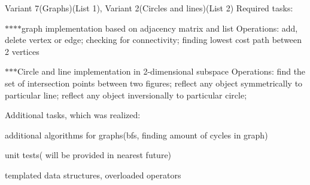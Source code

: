 Variant 7(Graphs)(List 1), Variant 2(Circles and lines)(List 2) Required tasks\+:

$\ast$$\ast$$\ast$$\ast$graph implementation based on adjacency matrix and list Operations\+: add, delete vertex or edge; checking for connectivity; finding lowest cost path between 2 vertices

$\ast$$\ast$$\ast$\+Circle and line implementation in 2-\/dimensional subspace Operations\+: find the set of intersection points between two figures; reflect any object symmetrically to particular line; reflect any object inversionally to particular circle;

Additional tasks, which was realized\+:


\begin{DoxyItemize}
\item additional algorithms for graphs(bfs, finding amount of cycles in graph)
\item unit tests( will be provided in nearest future)
\item templated data structures, overloaded operators 
\end{DoxyItemize}